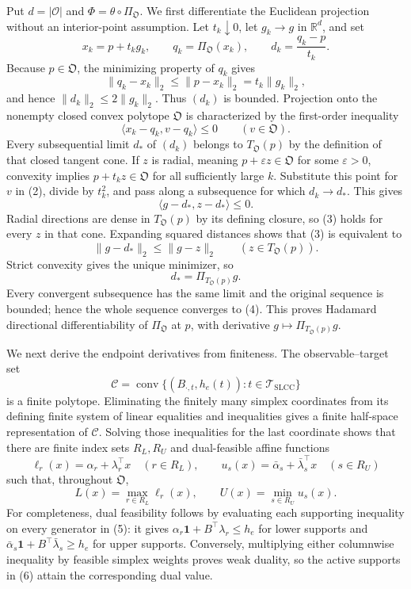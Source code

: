 Put \(d=|\mathcal O|\) and \(\Phi=\theta\circ\Pi_{\mathfrak O}\).  We first differentiate the Euclidean projection without an interior-point assumption.  Let \(t_k\downarrow0\), let \(g_k\to g\) in \(\mathbb R^d\), and set
\[
x_k=p+t_kg_k,
\qquad
q_k=\Pi_{\mathfrak O}(x_k),
\qquad
d_k=\frac{q_k-p}{t_k}.
\tag{1}
\]
Because \(p\in\mathfrak O\), the minimizing property of \(q_k\) gives
\[
\|q_k-x_k\|_2\leq\|p-x_k\|_2=t_k\|g_k\|_2,
\]
and hence \(\|d_k\|_2\leq2\|g_k\|_2\).  Thus \((d_k)\) is bounded.  Projection onto the nonempty closed convex polytope \(\mathfrak O\) is characterized by the first-order inequality
\[
\langle x_k-q_k,v-q_k\rangle\leq0
\qquad(v\in\mathfrak O).
\tag{2}
\]
Every subsequential limit \(d_*\) of \((d_k)\) belongs to \(T_{\mathfrak O}(p)\) by the definition of that closed tangent cone.  If \(z\) is radial, meaning \(p+\varepsilon z\in\mathfrak O\) for some \(\varepsilon>0\), convexity implies \(p+t_kz\in\mathfrak O\) for all sufficiently large \(k\).  Substitute this point for \(v\) in (2), divide by \(t_k^2\), and pass along a subsequence for which \(d_k\to d_*\).  This gives
\[
\langle g-d_*,z-d_*\rangle\leq0.
\tag{3}
\]
Radial directions are dense in \(T_{\mathfrak O}(p)\) by its defining closure, so (3) holds for every \(z\) in that cone.  Expanding squared distances shows that (3) is equivalent to
\[
\|g-d_*\|_2\leq\|g-z\|_2
\qquad(z\in T_{\mathfrak O}(p)).
\]
Strict convexity gives the unique minimizer, so
\[
d_*=\Pi_{T_{\mathfrak O}(p)}g.
\tag{4}
\]
Every convergent subsequence has the same limit and the original sequence is bounded; hence the whole sequence converges to (4).  This proves Hadamard directional differentiability of \(\Pi_{\mathfrak O}\) at \(p\), with derivative \(g\mapsto\Pi_{T_{\mathfrak O}(p)}g\).

We next derive the endpoint derivatives from finiteness.  The observable--target set
\[
\mathcal C=\operatorname{conv}\{(B_{\cdot,t},h_e(t)):t\in\mathcal T_{\mathrm{SLCC}}\}
\tag{5}
\]
is a finite polytope.  Eliminating the finitely many simplex coordinates from its defining finite system of linear equalities and inequalities gives a finite half-space representation of \(\mathcal C\).  Solving those inequalities for the last coordinate shows that there are finite index sets \(R_L,R_U\) and dual-feasible affine functions
\[
\ell_r(x)=\alpha_r+\lambda_r^{\top}x\quad(r\in R_L),
\qquad
u_s(x)=\bar\alpha_s+\bar\lambda_s^{\top}x\quad(s\in R_U)
\]
such that, throughout \(\mathfrak O\),
\[
L(x)=\max_{r\in R_L}\ell_r(x),
\qquad
U(x)=\min_{s\in R_U}u_s(x).
\tag{6}
\]
For completeness, dual feasibility follows by evaluating each supporting inequality on every generator in (5): it gives \(\alpha_r\mathbf 1+B^{\top}\lambda_r\leq h_e\) for lower supports and \(\bar\alpha_s\mathbf 1+B^{\top}\bar\lambda_s\geq h_e\) for upper supports.  Conversely, multiplying either columnwise inequality by feasible simplex weights proves weak duality, so the active supports in (6) attain the corresponding dual value.

